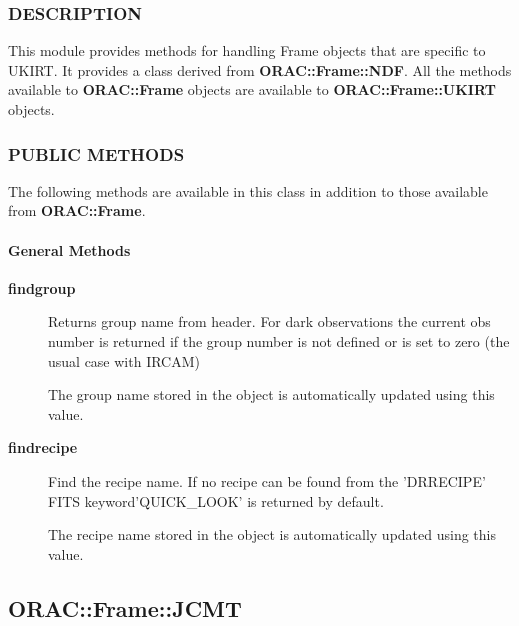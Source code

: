 \subsubsection*{DESCRIPTION\label{ORAC::Frame::UKIRT_DESCRIPTION}}

This module provides methods for handling Frame objects that
are specific to UKIRT. It provides a class derived from \textbf{ORAC::Frame::NDF}.
All the methods available to \textbf{ORAC::Frame} objects are available
to \textbf{ORAC::Frame::UKIRT} objects.

\subsubsection*{PUBLIC METHODS\label{ORAC::Frame::UKIRT_PUBLIC_METHODS}}

The following methods are available in this class in addition to
those available from \textbf{ORAC::Frame}.

\paragraph*{General Methods\label{ORAC::Frame::UKIRT_General_Methods}}\begin{description}
\item[\textbf{findgroup}] \mbox{}

Returns group name from header.  For dark observations the current obs
number is returned if the group number is not defined or is set to zero
(the usual case with IRCAM)



The group name stored in the object is automatically updated using 
this value.

\item[\textbf{findrecipe}] \mbox{}

Find the recipe name. If no recipe can be found from the
'DRRECIPE' FITS keyword'QUICK\_LOOK' is returned by default.



The recipe name stored in the object is automatically updated using 
this value.

\end{description}


\subsection{ORAC::Frame::JCMT\label{ORAC::Frame::JCMT}}

